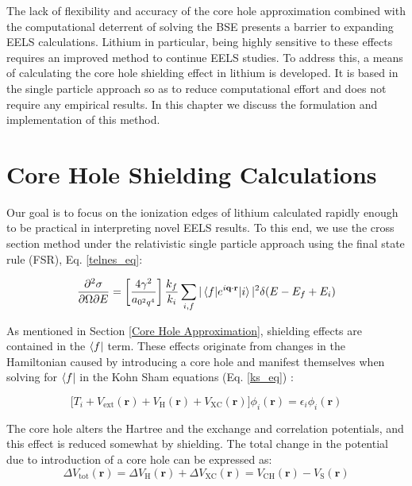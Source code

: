 




The lack of flexibility and accuracy of the core hole approximation combined with the computational deterrent of solving the BSE presents a barrier to expanding EELS calculations.  Lithium in particular, being highly sensitive to these effects requires an improved method to continue EELS studies.  To address this, a means of calculating the core hole shielding effect in lithium is developed.  It is based in the single particle approach so as to reduce computational effort and does not require any empirical results.  In this chapter we discuss the formulation and implementation of this method. 


\section{Core Hole Shielding Calculations}
Our goal is to focus on the ionization edges of lithium calculated rapidly enough to be practical in interpreting novel EELS results.  To this end, we use the cross section method under the relativistic single particle approach using the final state rule (FSR), Eq. \ref{telnes_eq}\cite{jorissen2007ab}:

\begin{equation}
	\frac{\partial^2 \sigma}{\partial \Omega \partial E} = \left[\frac{4\gamma^2}{a_{\mathrm{0}^2q^4}}\right] \frac{k_f}{k_i} \sum_{i,f}|\mel{f}{e^{i\textbf{q}\cdot\textbf{r}}}{i}|^2\delta(E-E_f+E_i)
\end{equation}

As mentioned in Section \ref{Core Hole Approximation}, shielding effects are contained in the $\bra{f}$ term. These effects originate from changes in the Hamiltonian caused by introducing a core hole and manifest themselves when solving for $\bra{f}$ in the Kohn Sham equations (Eq. \ref{ks_eq}) \cite{kohn_self-consistent_1965}:  

\begin{equation}
    \bigg[T_i + V_{\mathrm{ext}}(\textbf{r}) + V_{\mathrm{H}}(\textbf{r}) + V_{\mathrm{XC}}(\textbf{r})\bigg] \phi_i(\textbf{r}) = \epsilon_i \phi_i(\textbf{r})
\end{equation}

The core hole alters the Hartree and the exchange and correlation potentials, and this effect is reduced somewhat by shielding.  The total change in the potential due to introduction of a core hole can be expressed as: 
\begin{equation}
\Delta V_{\mathrm{tot}}(\textbf{r})=\Delta V_{\mathrm{H}}(\textbf{r}) +\Delta V_{\mathrm{XC}}(\textbf{r})=V_{\mathrm{CH}}(\textbf{r}) - V_{\mathrm{S}}(\textbf{r})
\label{delta_potentials}
\end{equation}

